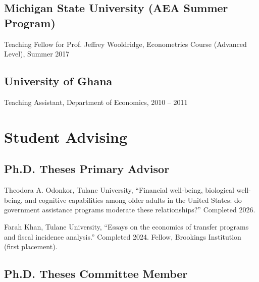 \documentclass[12pt,letterpaper]{article}
\renewenvironment{itemize}{
	\begin{list}{}{
			\setlength{\leftmargin}{1em}
			\setlength{\itemsep}{0.15em}
			\setlength{\parskip}{0pt}
			\setlength{\parsep}{0.2em}
		}
	}{
	\end{list}
}
\begin{document}
\subsection*{Michigan State University (AEA Summer Program)}
\begin{itemize}
	\item Teaching Fellow for Prof. Jeffrey Wooldridge, Econometrics Course (Advanced Level), Summer 2017
\end{itemize}

\subsection*{University of Ghana}
\begin{itemize}
	\item Teaching Assistant, Department of Economics, 2010 -- 2011 
\end{itemize}
	


\section*{Student Advising}
\subsection*{Ph.D. Theses Primary Advisor}
\begin{itemize}
\item Theodora A. Odonkor, Tulane University, ``Financial well-being, biological well-being, and cognitive capabilities among older adults in the United States: do government assistance programs moderate these relationships?'' Completed 2026.
\item Farah Khan, Tulane University, ``Essays on the economics of transfer programs and fiscal incidence analysis.'' Completed 2024. Fellow, Brookings Institution (first placement).
\end{itemize}

\subsection*{Ph.D. Theses Committee Member}
\end{document}

